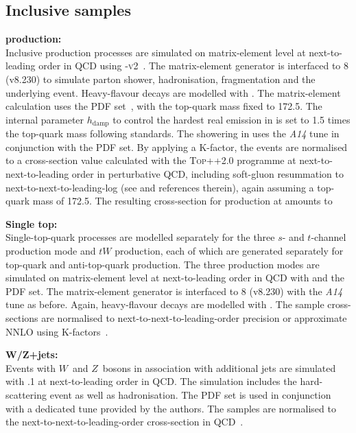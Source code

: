 \subsection{Inclusive samples}
\label{sec:used-incl-sampl}
\textbf{\ttbar production:}\\
Inclusive \ttbar production processes are simulated on matrix-element level at next-to-leading order in QCD using \powhegbox{}-\textsc{v2}~\cite{Nason:2004rx,Frixione:2007vw,Alioli:2010xd}. The matrix-element generator is interfaced to \pythia{}8 (v8.230) to simulate parton shower, hadronisation, fragmentation and the underlying event. Heavy-flavour decays are modelled with \evtgen. The matrix-element calculation uses the \nnpdfnlo PDF set~\cite{Ball:2014uwa}, with the top-quark mass fixed to \SI{172.5}{\gev}. The internal parameter $h_{\text{damp}}$ to control the hardest real emission in \POWHEG is set to 1.5 times the top-quark mass following \atlas standards. The showering in \pythia uses the \emph{A14} tune in conjunction with the \nnpdflo PDF set. By applying a K-factor, the events are normalised to a cross-section value calculated with the \textsc{Top++2.0} programme at next-to-next-to-leading order in perturbative QCD, including soft-gluon resummation to next-to-next-to-leading-log (see \cite{Czakon:2011xx} and references therein), again assuming a top-quark mass of \SI{172.5}{\gev}. The resulting cross-section for \ttbar production at \sqrtsfull amounts to %

\textbf{Single top:}\\
Single-top-quark processes are modelled separately for the three $s$- and $t$-channel production mode and $tW$ production, 
each of which are generated separately for top-quark and anti-top-quark production. The three production modes are simulated on matrix-element level at next-to-leading order in QCD with \powhegbox and the \nnpdflo PDF set. The matrix-element generator is interfaced to \pythia{}8 (v8.230) with the \emph{A14} tune as before. Again, heavy-flavour decays are modelled with \evtgen. The sample cross-sections are normalised to next-to-next-to-leading-order precision or approximate NNLO using K-factors~\cite{Kidonakis:2010tc,Kidonakis:2010ux,Kidonakis:2011wy}. 

\textbf{W/Z+jets:}\\
Events with $W$~and $Z$~bosons in association with additional jets are simulated with .1 at next-to-leading order in QCD. The simulation includes the hard-scattering event as well as hadronisation. The \nnpdfnlo PDF set is used in conjunction with a dedicated tune provided by the \sherpa authors. The samples are normalised to the next-to-next-to-leading-order cross-section in QCD~\cite{ATLAS-CONF-2015-039}.

